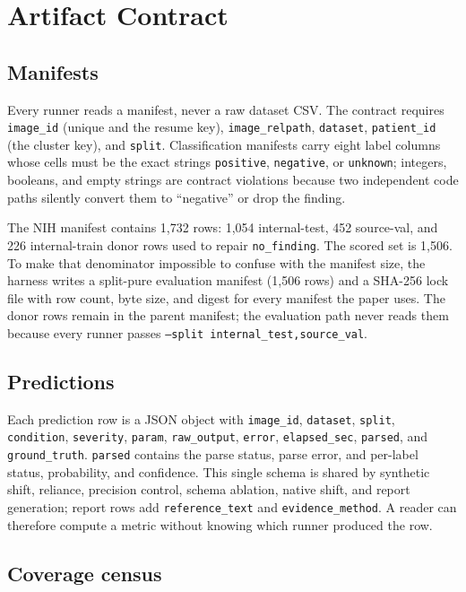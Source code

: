 \section{Artifact Contract}
\label{sec:artifacts}

\subsection{Manifests}

Every runner reads a manifest, never a raw dataset CSV. The contract requires \texttt{image\_id} (unique and the resume key), \texttt{image\_relpath}, \texttt{dataset}, \texttt{patient\_id} (the cluster key), and \texttt{split}. Classification manifests carry eight label columns whose cells must be the exact strings \texttt{positive}, \texttt{negative}, or \texttt{unknown}; integers, booleans, and empty strings are contract violations because two independent code paths silently convert them to ``negative'' or drop the finding.

The NIH manifest contains 1,732 rows: 1,054 internal-test, 452 source-val, and 226 internal-train donor rows used to repair \texttt{no\_finding}. The scored set is 1,506. To make that denominator impossible to confuse with the manifest size, the harness writes a split-pure evaluation manifest (1,506 rows) and a SHA-256 lock file with row count, byte size, and digest for every manifest the paper uses. The donor rows remain in the parent manifest; the evaluation path never reads them because every runner passes \texttt{--split internal\_test,source\_val}.

\subsection{Predictions}

Each prediction row is a JSON object with \texttt{image\_id}, \texttt{dataset}, \texttt{split}, \texttt{condition}, \texttt{severity}, \texttt{param}, \texttt{raw\_output}, \texttt{error}, \texttt{elapsed\_sec}, \texttt{parsed}, and \texttt{ground\_truth}. \texttt{parsed} contains the parse status, parse error, and per-label status, probability, and confidence. This single schema is shared by synthetic shift, reliance, precision control, schema ablation, native shift, and report generation; report rows add \texttt{reference\_text} and \texttt{evidence\_method}. A reader can therefore compute a metric without knowing which runner produced the row.

\subsection{Coverage census}

